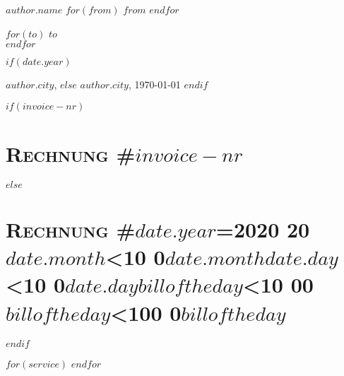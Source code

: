 \documentclass[$fontsize$, a4paper]{article}
\renewcommand{\arraystretch}{1.5} %
\gdef\TotalHT{0}
\begin{document}
\small
\textsc{\textbf{$author.name$}}
$for(from)$
\textbullet{} \textsc{$from$}
$endfor$

\vspace{1em}

\normalsize \sffamily
$for(to)$
$to$\\
$endfor$

\vspace{6em}

\begin{flushright}
  \small
  $if(date.year)$
    \date{}
    $author.city$, 
  $else$
    $author.city$, \today
  $endif$
\end{flushright}

\vspace{1em}

$if(invoice-nr)$
  \section*{\textsc{Rechnung} \textsc{\#$invoice-nr$}}
$else$
  \section*{\textsc{Rechnung} \textsc{\#\ifnum $date.year$=2020 20\else {} \fi
  \ifnum $date.month$<10 0\fi $date.month$\ifnum $date.day$<10 0\fi $date.day$\ifnum $billoftheday$<10 00\else \ifnum $billoftheday$<100 0\fi\fi $billoftheday$}}
$endif$
\footnotesize

\renewcommand\arraystretch{1.5}
\setcounter{pos}{0}

\setlength\dashlinedash{0.2pt}
\setlength\dashlinegap{1.5pt}
\setlength\arrayrulewidth{0.3pt}

$for(service)$
  \FPmul{}
  \FPround{}
  \FPadd\total{\TotalHT}{\temp}
  \FPround{}
  \global\let\TotalHT\total
$endfor$
\end{document}
